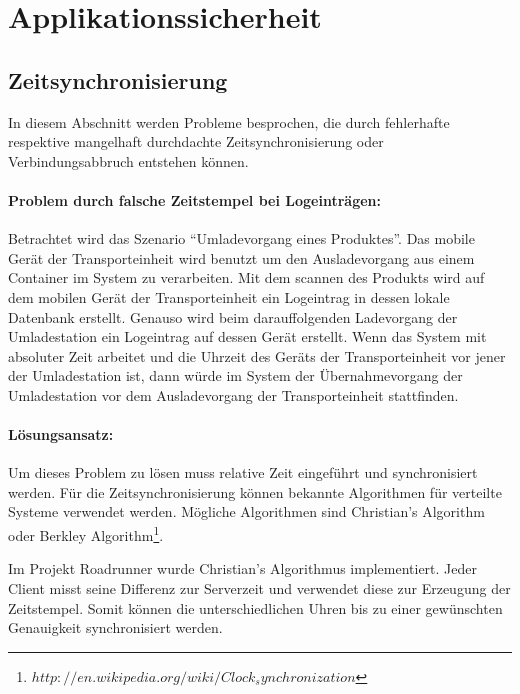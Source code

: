 \section{Applikationssicherheit}
\label{sec:security}

\subsection{Zeitsynchronisierung}
\label{subsec:timesync}

In diesem Abschnitt werden Probleme besprochen, die durch fehlerhafte respektive
mangelhaft durchdachte Zeitsynchronisierung oder Verbindungsabbruch entstehen
können.

\paragraph{Problem durch falsche Zeitstempel bei Logeinträgen:}
Betrachtet wird das Szenario ``Umladevorgang eines Produktes''. Das mobile
Gerät der Transporteinheit wird benutzt um den Ausladevorgang aus einem
Container im System zu verarbeiten. Mit dem scannen des Produkts wird auf dem
mobilen Gerät der Transporteinheit ein Logeintrag in dessen lokale Datenbank
erstellt. Genauso wird beim darauffolgenden Ladevorgang der Umladestation ein
Logeintrag auf dessen Gerät erstellt. Wenn das System mit absoluter Zeit
arbeitet und die Uhrzeit des Geräts der Transporteinheit vor jener der
Umladestation ist, dann würde im System der Übernahmevorgang der Umladestation
vor dem Ausladevorgang der Transporteinheit stattfinden.
\par
\paragraph{Lösungsansatz:}
Um dieses Problem zu lösen muss relative Zeit eingeführt und synchronisiert
werden. Für die Zeitsynchronisierung können bekannte Algorithmen für verteilte
Systeme verwendet werden. Mögliche Algorithmen sind Christian's Algorithm oder Berkley Algorithm\footnote{$http://en.wikipedia.org/wiki/Clock_synchronization$}.
\par
Im Projekt Roadrunner wurde Christian's Algorithmus implementiert. Jeder Client misst seine Differenz zur Serverzeit und verwendet diese zur Erzeugung der Zeitstempel. Somit können die unterschiedlichen Uhren bis zu einer gewünschten Genauigkeit synchronisiert werden.

